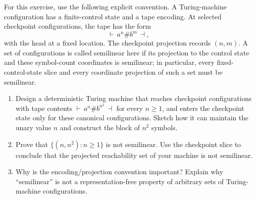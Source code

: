 \documentclass{tutorial}
\begin{document}
\begin{exercise}
For this exercise, use the following explicit convention. A Turing-machine
configuration has a finite-control state and a tape encoding. At selected
checkpoint configurations, the tape has the form
\[
  \vdash\, a^n\#b^m\,\dashv,
\]
with the head at a fixed location. The checkpoint projection records
$(n,m)$. A set of configurations is called semilinear here if its
projection to the control state and these symbol-count coordinates is
semilinear; in particular, every fixed-control-state slice and every
coordinate projection of such a set must be semilinear.
\begin{enumerate}
  \item Design a deterministic Turing machine that reaches checkpoint
        configurations with tape contents
        $\vdash\,a^n\#b^{n^2}\,\dashv$ for every $n\geq 1$, and enters
        the checkpoint state only for these canonical configurations.
        Sketch how it can maintain the unary value $n$ and construct the
        block of $n^2$ symbols.
  \item Prove that $\{(n,n^2):n\geq 1\}$ is not semilinear. Use the
        checkpoint slice to conclude that the projected reachability set
        of your machine is not semilinear.
  \item Why is the encoding/projection convention important? Explain why
        ``semilinear'' is not a representation-free property of arbitrary
        sets of Turing-machine configurations.
\end{enumerate}
\end{exercise}
\end{document}
